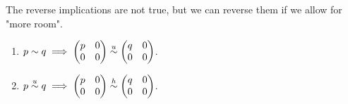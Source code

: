 \noindent The reverse implications are not true, but we can reverse them if we allow for "more room".
\begin{proposition}\noindent 
 \begin{enumerate}
  \item $p\sim q\implies \begin{pmatrix} p & 0 \\ 0 & 0\end{pmatrix}\stackrel{u}{\sim} \begin{pmatrix} q & 0 \\ 0 & 0\end{pmatrix}$.
  \item $p\stackrel{u}{\sim} q\implies\begin{pmatrix} p & 0 \\ 0 & 0\end{pmatrix}\stackrel{h}{\sim} \begin{pmatrix} q & 0 \\ 0 & 0\end{pmatrix}$.
 \end{enumerate}
\end{proposition}
